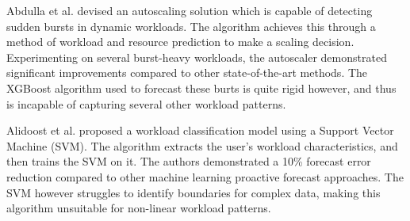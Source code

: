 Abdulla et al. \cite{abdullah2020burst} devised an autoscaling solution which is capable of detecting sudden bursts in dynamic workloads. The algorithm achieves this through a method of workload and resource prediction to make a scaling decision. Experimenting on several burst-heavy workloads, the autoscaler demonstrated significant improvements compared to other state-of-the-art methods. The XGBoost algorithm used to forecast these burts is quite rigid however, and thus is incapable of capturing several other workload patterns.\par

Alidoost et al. \cite{alidoost2023introducing} proposed a workload classification model using a Support Vector Machine (SVM). The algorithm extracts the user's workload characteristics, and then trains the SVM on it. The authors demonstrated a 10\% forecast error reduction compared to other machine learning proactive forecast approaches. The SVM however struggles to identify boundaries for complex data, making this algorithm unsuitable for non-linear workload patterns.\par

